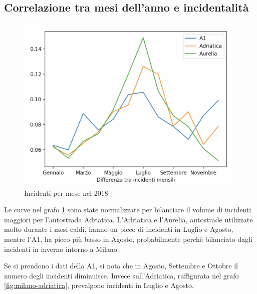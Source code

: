 \documentclass[a4paper]{report}
\begin{document}
\subsection{Correlazione tra mesi dell'anno e incidentalità}
\begin{figure}
    \includegraphics[width=\linewidth]{../src/incidenti/incidenti_aci/autostrade/mesi_autostrade.png}
    \caption{Incidenti per mese nel 2018}
    \label{fig:incidenti-per-mese}
\end{figure}

Le curve nel grafo \ref{fig:incidenti-per-mese} sono state normalizzate per bilanciare il volume di incidenti maggiori per 
l'autostrada Adriatica.
L'Adriatica e l'Aurelia, autostrade utilizzate molto durante i mesi caldi, hanno un picco di 
incidenti in Luglio e Agosto, mentre l'A1, ha picco più basso in Agosto, probabilmente 
perchè bilanciato dagli incidenti in inverno intorno a Milano.

Se si prendono i dati della A1, si nota 
che in Agosto, Settembre e Ottobre il numero degli incidenti diminuisce.
Invece sull'Adriatica, raffigurata nel grafo \ref{fig:milano-adriatica}, 
prevalgono incidenti in Luglio e Agosto.
\end{document}
